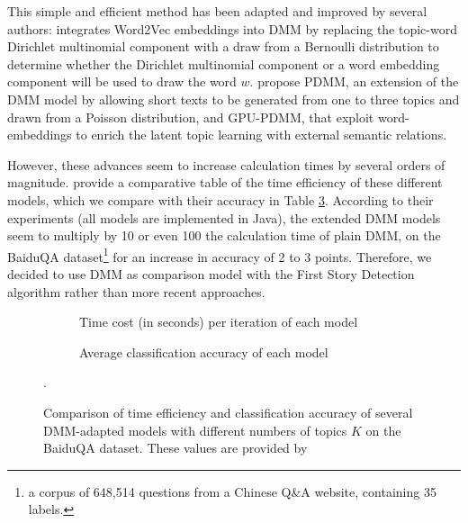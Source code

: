 This simple and efficient method has been adapted and improved by several authors:
\citet{nguyen2015improving} integrates Word2Vec embeddings into DMM by replacing the topic-word Dirichlet multinomial component with a draw from a Bernoulli distribution to determine whether the Dirichlet multinomial component or a word embedding component will be used to draw the word $w$. \citet{li_enhancing_2017} propose PDMM, an extension of the DMM model by allowing short texts to be generated from one to three topics and drawn from a Poisson distribution, and GPU-PDMM, that exploit word-embeddings to enrich the latent topic learning with external semantic relations. 

However, these advances seem to increase calculation times by several orders of magnitude. \citet{li_enhancing_2017} provide a comparative table of the time efficiency of these different models, which we compare with their accuracy in Table \ref{Tab: BenchmarkDMM}. According to their experiments (all models are implemented in Java), the extended DMM models seem to multiply by 10 or even 100 the calculation time of plain DMM, on the BaiduQA dataset\footnote{a corpus of 648,514 questions from a Chinese Q\&A website, containing 35 labels.} for an increase in accuracy of 2 to 3 points. Therefore, we decided to use DMM as comparison model with the First Story Detection algorithm rather than more recent approaches.


\begin{figure}[h]
\centering
\begin{subfigure}{.5\textwidth}
  \centering
  
  \caption{Time cost (in seconds) per iteration of each model}
  \label{Tab: time_efficiency}
\end{subfigure}%
\begin{subfigure}{.5\textwidth}
  \centering
  
  \caption{Average classification accuracy of each model}
  \label{Tab: classification_accuracy}
\end{subfigure}
\caption{Comparison of time efficiency and classification accuracy of several DMM-adapted models with different numbers of topics $K$ on the BaiduQA dataset. These values are provided by \citet{li_enhancing_2017}}.
\label{Tab: BenchmarkDMM}
\end{figure}
 	 


